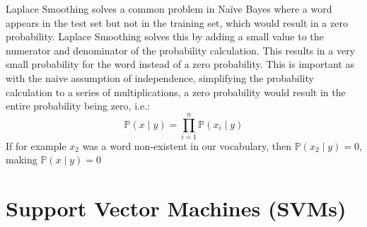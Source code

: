 \documentclass[12pt letter]{report}
\begin{document}
Laplace Smoothing solves a common problem in Naïve Bayes where a word appears in the test set but not in the training
set, which would result in a zero probability. Laplace Smoothing solves this by adding a small value to the numerator
and denominator of the probability calculation. This results in a very small probability for the word instead of a zero
probability. This is important as with the naive assumption of independence, simplifying the probability calculation to
a series of multiplications, a zero probability would result in the entire probability being zero, i.e.:
\[
  \mathbb{P} \left( x  \mid y \right) = \prod_{i=1}^{n} \mathbb{P} \left( x_i  \mid y \right)
\]
If for example $x_2$ was a word non-existent in our vocabulary, then $\mathbb{P} \left( x_2  \mid y \right) = 0$, making
$\mathbb{P} \left( x  \mid y \right) = 0 $

\chapter{Support Vector Machines (SVMs)}
\end{document}
